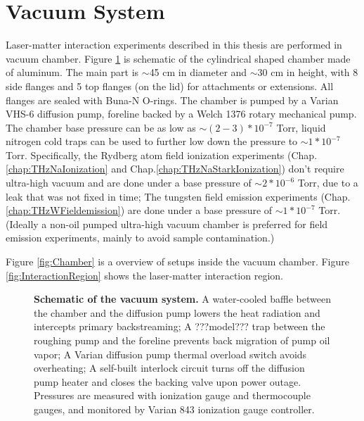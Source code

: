 \section{Vacuum System}

Laser-matter interaction experiments described in this thesis are performed in vacuum chamber. Figure \ref{fig:VacuumSystem} is schematic of the cylindrical shaped chamber made of aluminum. The main part is $\sim$45 cm in diameter and $\sim$30 cm in height,
with 8 side flanges and 5 top flanges (on the lid) for attachments or extensions. All flanges are sealed with Buna-N O-rings. The chamber is pumped by a Varian VHS-6 diffusion pump, foreline backed by a Welch 1376 rotary mechanical pump. The chamber base pressure can be as low as $\sim (2-3) \ast 10^{-7}$ Torr, liquid nitrogen cold traps can be used to further low down the pressure to $\sim 1 \ast 10^{-7}$ Torr. Specifically, the Rydberg atom field ionization experiments (Chap.\@ \ref{chap:THzNaIonization} and Chap.\@ \ref{chap:THzNaStarkIonization}) don't require ultra-high vacuum and are done under a base pressure of $\sim 2 \ast 10^{-6}$ Torr, due to a leak that was not fixed in time; The tungsten field emission experiments (Chap.\@ \ref{chap:THzWFieldemission}) are done under a base pressure of $\sim 1 \ast 10^{-7}$ Torr. (Ideally a non-oil pumped ultra-high vacuum chamber is preferred for field emission experiments, mainly to avoid sample contamination.)

Figure \ref{fig:Chamber} is a overview of setups inside the vacuum chamber. Figure \ref{fig:InteractionRegion} shows the laser-matter interaction region.
\begin{figure}	
    \centering
    \caption[Schematic of the vacuum system.]{{\bf Schematic of the vacuum system.} A water-cooled baffle between the chamber and the diffusion pump lowers the heat radiation and intercepts primary backstreaming; A ???model??? trap between the roughing pump and the foreline prevents back migration of pump oil vapor; A Varian diffusion pump thermal overload switch avoids overheating; A self-built interlock circuit turns off the diffusion pump heater and closes the backing valve upon power outage. Pressures are measured with ionization gauge and thermocouple gauges, and monitored by Varian 843 ionization gauge controller.}
    \label{fig:VacuumSystem}
\end{figure}

